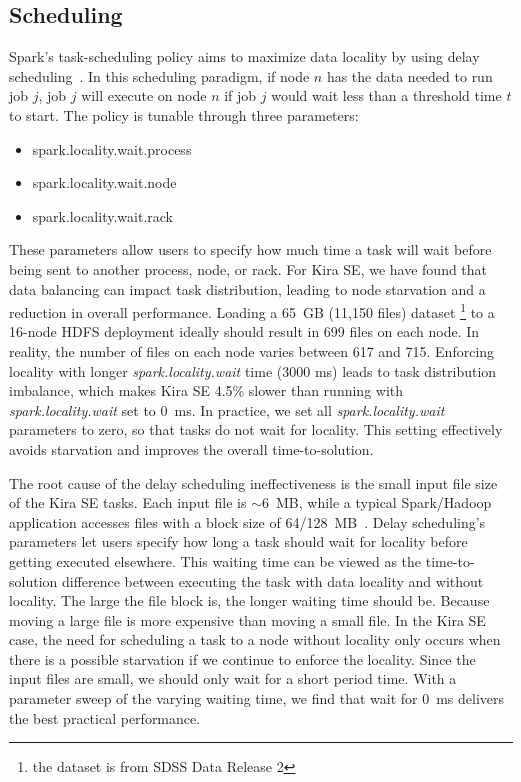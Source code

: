 \documentclass[conference]{IEEEtran}
\begin{document}
\subsection{Scheduling}

Spark's task-scheduling policy aims to maximize data locality by using
delay scheduling~\cite{zaharia10ds}. In this scheduling paradigm, if node $n$ has the data needed
to run job $j$, job $j$ will execute on node $n$ if job $j$ would wait less than a threshold time
$t$ to start. The policy is tunable through three parameters:

\begin{itemize}
\item{spark.locality.wait.process}
\item{spark.locality.wait.node}
\item{spark.locality.wait.rack}
\end{itemize}

These parameters allow users to specify how much time a task will wait before being sent to another
process, node, or rack. For Kira SE, we have found that data balancing can 
impact task distribution, leading to node starvation and a reduction in overall performance.
Loading a 65~GB (11,150 files) dataset \footnote{the dataset is from SDSS Data Release 2} to a 16-node HDFS deployment ideally should result in 699 files on each node.
In reality, the number of files on each node varies between 617 and 715.
Enforcing locality with longer {\em spark.locality.wait} time (3000 ms) leads to task distribution imbalance, which makes
Kira SE 4.5\% slower than running with {\em spark.locality.wait} set to 0~ms.
In practice, we set all {\em spark.locality.wait} parameters to zero, so that tasks do not wait for locality.
This setting effectively avoids starvation and improves the overall time-to-solution.

The root cause of the delay scheduling ineffectiveness is the small input file size of the Kira SE tasks. 
Each input file is $\sim$6~MB, while a typical Spark/Hadoop application accesses files with a block size of 64/128~MB~\cite{shvachko10}.
Delay scheduling's parameters let users specify how long a task should wait for locality before getting executed elsewhere.
This waiting time can be viewed as the time-to-solution difference between executing the task with data locality and without locality.
The large the file block is, the longer waiting time should be. Because moving a large file is more expensive than moving
a small file. In the Kira SE case, the need for scheduling a task to a node without locality only occurs when there is a possible
starvation if we continue to enforce the locality. Since the input files are small, we should only wait for a short period time. With
a parameter sweep of the varying waiting time, we find that wait for 0~ms delivers the best practical performance.
\end{document}
